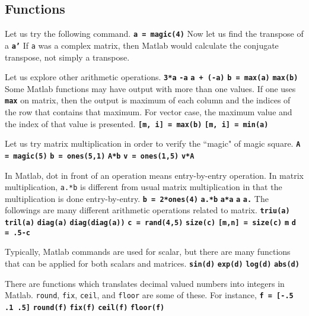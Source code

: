 \subsection{Functions} \label{Matlab-ft}
Let us try the following command. \matlabp\texttt{\textbf{a = magic(4)}} \vn Now let us find the transpose of a \matlabp\texttt{\textbf{a'}} \vn If {\tt a} was a complex matrix, then Matlab would calculate the conjugate transpose, not simply a transpose. 

\vv Let us explore other arithmetic operations. \matlabp\texttt{\textbf{3*a}} \matlabp\texttt{\textbf{-a}} \matlabp\texttt{\textbf{a + (-a)}} \matlabp\texttt{\textbf{b = max(a)}} \matlabp\texttt{\textbf{max(b)}} \vn Some Matlab functions may have output with more than one values. If one uses \texttt{\textbf{max}} on matrix, then the output is maximum of each column and the indices of the row that contains that maximum. For vector case, the maximum value and the index of that value is presented. \matlabp\texttt{\textbf{[m, i] = max(b)}} \matlabp\texttt{\textbf{[m, i] = min(a)}}

\vn Let us try matrix multiplication in order to verify the ``magic" of magic square.  \matlabp\texttt{\textbf{A = magic(5)}}  \matlabp\texttt{\textbf{b = ones(5,1)}}  \matlabp\texttt{\textbf{A*b}}  \matlabp\texttt{\textbf{v = ones(1,5)}}  \matlabp\texttt{\textbf{v*A}}

\vv In Matlab, dot in front of an operation means entry-by-entry operation. In matrix multiplication, {\tt a.*b} is different from usual matrix multiplication in that the multiplication is done entry-by-entry.  \matlabp\texttt{\textbf{b = 2*ones(4)}}  \matlabp\texttt{\textbf{a.*b}}  \matlabp\texttt{\textbf{a*a}}  \matlabp\texttt{\textbf{a}}  \matlabp\texttt{\textbf{a.}} \vn The followings are many different arithmetic operations related to matrix.  \matlabp\texttt{\textbf{triu(a)}}  \matlabp\texttt{\textbf{tril(a)}}  \matlabp\texttt{\textbf{diag(a)}}  \matlabp\texttt{\textbf{diag(diag(a))}}  \matlabp\texttt{\textbf{c = rand(4,5)}}  \matlabp\texttt{\textbf{size(c)}}  \matlabp\texttt{\textbf{[m,n] = size(c)}}  \matlabp\texttt{\textbf{m}}  \matlabp\texttt{\textbf{d = .5-c}}

\vv Typically, Matlab commands are used for scalar, but there are many functions that can be applied for both scalars and matrices.  \matlabp\texttt{\textbf{sin(d)}}  \matlabp\texttt{\textbf{exp(d)}}  \matlabp\texttt{\textbf{log(d)}}  \matlabp\texttt{\textbf{abs(d)}}

\vv There are functions which translates decimal valued numbers into integers in Matlab. {\tt round}, {\tt fix}, {\tt ceil}, and {\tt floor} are some of these. For instance,  \matlabp\texttt{\textbf{f = [-.5 .1 .5]}}  \matlabp\texttt{\textbf{round(f)}}  \matlabp\texttt{\textbf{fix(f)}}  \matlabp\texttt{\textbf{ceil(f)}}  \matlabp\texttt{\textbf{floor(f)}}

